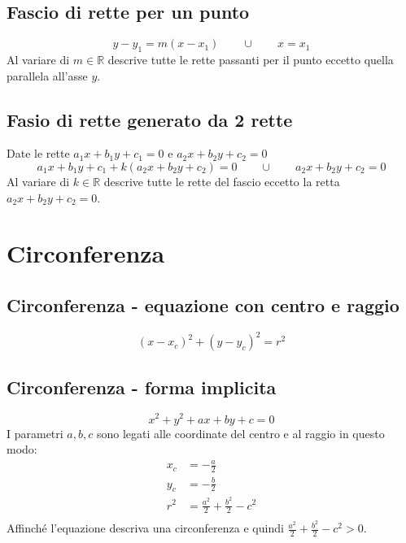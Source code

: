 \documentclass{article}
\begin{document}
  \subsection*{Fascio di rette per un punto}
  \begin{equation}
    y-y_1 = m(x-x_1) \qquad\cup\qquad x = x_1
  \end{equation}
  Al variare di $m \in \mathbb{R}$ descrive tutte le rette passanti per il punto eccetto quella parallela all'asse $y$.

  \subsection*{Fasio di rette generato da 2 rette}
  Date le rette $a_1x+b_1y+c_1 = 0$ e $a_2x+b_2y+c_2 = 0$
  \begin{equation}
    a_1x+b_1y+c_1 + k (a_2x+b_2y+c_2) = 0 \qquad\cup\qquad a_2x+b_2y+c_2 = 0
  \end{equation}
  Al variare di $k \in \mathbb{R}$ descrive tutte le rette del fascio eccetto la retta $a_2x+b_2y+c_2 = 0$.

  \newpage
  \section{Circonferenza}
  \subsection*{Circonferenza - equazione con centro e raggio}
  \begin{equation}
    (x-x_c)^2+(y-y_c)^2 = r^2
  \end{equation}

  \subsection*{Circonferenza - forma implicita}
  \begin{equation}
    x^2+y^2+ax+by+c = 0
  \end{equation}
  I parametri $a, b, c$ sono legati alle coordinate del centro e al raggio in questo modo: 
  \begin{align*}
    x_c &= -\frac{a}{2}\\
    y_c &= -\frac{b}{2}\\
    r^2 &= \frac{a^2}{2} + \frac{b^2}{2} - c^2 \\
  \end{align*}
  Affinché l'equazione descriva una circonferenza e quindi $\frac{a^2}{2} + \frac{b^2}{2} - c^2 > 0$.
\end{document}
